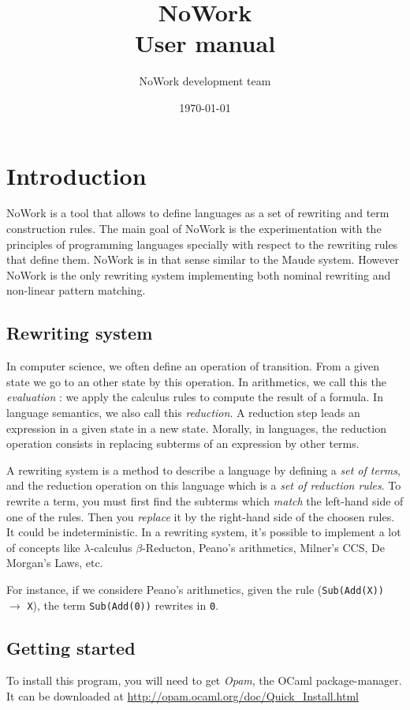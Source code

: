 \documentclass[12pt,a4paper]{article}
\title{NoWork\\
User manual}
\author{NoWork development team\\[2em]}
\date\today
\begin{document}
\maketitle


\section{Introduction}
NoWork is a tool that allows to define languages as a set of
rewriting and term construction rules. The main goal of NoWork
is the experimentation with the principles of programming languages
specially with respect to the rewriting rules that define them.
NoWork is in that sense similar to the Maude system. However NoWork
is the only rewriting system implementing both nominal rewriting and
non-linear pattern matching.

\subsection{Rewriting system}
In computer science, we often define an operation of transition. From a
given state we go to an other state by this operation. In arithmetics,
we call this the \emph{evaluation} : we apply the calculus rules to
compute the result of a formula. In language semantics, we also call
this \emph{reduction}. A reduction step leads an expression in a given
state in a new state. Morally, in languages, the reduction operation
consists in replacing subterms of an expression by other terms.

A rewriting system is a method to describe a language by defining a
\emph{set of terms}, and the reduction operation on this language which
is a \emph{set of reduction rules}. 
To rewrite a term, you must first find the subterms which \emph{match} the left-hand side of one of the rules. Then you \emph{replace} it by the right-hand side of the choosen rules. It
could be indeterministic. In a rewriting system, it's possible to implement a lot of concepts like
$\lambda$-calculus $\beta$-Reducton, Peano's arithmetics, Milner's CCS,
De Morgan's Laws, etc. 

For instance, if we considere Peano's arithmetics, 
given the rule (\texttt{Sub(Add(X))} $\rightarrow$ \texttt{X}),
the term \texttt{Sub(Add(0))} rewrites in \texttt{0}.

\subsection{Getting started}
To install this program, you will need to get \emph{Opam}, the OCaml package-manager.
It can be downloaded at \url{http://opam.ocaml.org/doc/Quick_Install.html}
\end{document}
